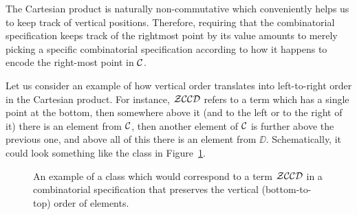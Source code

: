 \documentclass[12pt, a4paper, twoside]{report}
\begin{document}
   
The Cartesian product is naturally non-commutative which conveniently helps us to keep track of vertical positions. Therefore, requiring that the combinatorial specification keeps track of the rightmost point by its value amounts to merely picking a specific combinatorial specification according to how it happens to encode the right-most point in $\mathcal{C}$. 

Let us consider an example of how vertical order translates into left-to-right order in the Cartesian product. For instance, $\mathcal{Z}\mathcal{C}\mathcal{C}\mathcal{D}$ refers to a term which has a single point at the bottom, then somewhere above it (and to the left or to the right of it) there is an element from $\mathcal{C}$, then another element of $\mathcal{C}$ is further above the previous one, and above all of this there is an element from $\DD$. Schematically, it could look something like the class in Figure~\ref{fig:order}.

\begin{figure}[ht]
  \centering
  \caption{An example of a class which would correspond to a term $\mathcal{Z}\mathcal{C}\mathcal{C}\mathcal{D}$ in a combinatorial specification that preserves the vertical (bottom-to-top) order of elements.}
  \label{fig:order}
\end{figure}
\end{document}
